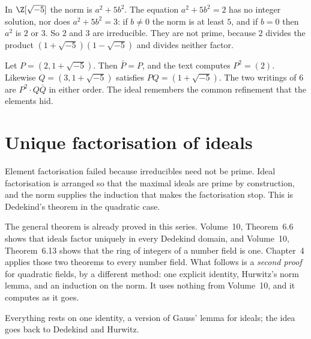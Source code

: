 \begin{examplex}
In $\Z[\sqrt{-5}]$ the norm is $a^2+5b^2$. The equation $a^2+5b^2=2$ has no integer solution, nor does $a^2+5b^2=3$: if $b\ne 0$ the norm is at least $5$, and if $b=0$ then $a^2$ is $2$ or $3$. So $2$ and $3$ are irreducible. They are not prime, because $2$ divides the product $(1+\sqrt{-5})(1-\sqrt{-5})$ and divides neither factor.
\end{examplex}

\begin{examplex}
Let $P=(2,1+\sqrt{-5})$. Then $\bar P=P$, and the text computes $P^2=(2)$. Likewise $Q=(3,1+\sqrt{-5})$ satisfies $PQ=(1+\sqrt{-5})$. The two writings of $6$ are $P^2\cdot Q\bar Q$ in either order. The ideal remembers the common refinement that the elements hid.
\end{examplex}

\section{Unique factorisation of ideals}

Element factorisation failed because irreducibles need not be prime. Ideal factorisation is arranged so that the maximal ideals are prime by construction, and the norm supplies the induction that makes the factorisation stop. This is Dedekind's theorem in the quadratic case.

The general theorem is already proved in this series. Volume~10, Theorem~6.6 shows that ideals factor uniquely in every Dedekind domain, and Volume~10, Theorem~6.13 shows that the ring of integers of a number field is one. Chapter~4 applies those two theorems to every number field. What follows is a \emph{second proof} for quadratic fields, by a different method: one explicit identity, Hurwitz's norm lemma, and an induction on the norm. It uses nothing from Volume~10, and it computes as it goes.

Everything rests on one identity, a version of Gauss' lemma for ideals; the idea goes back to Dedekind and Hurwitz.

